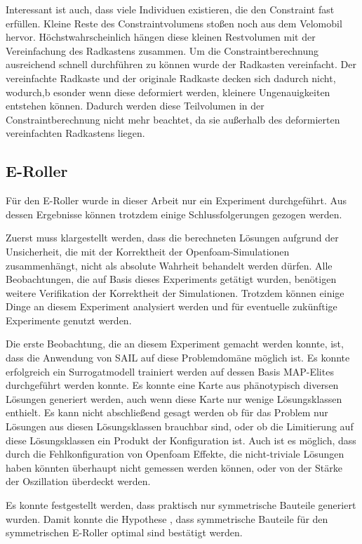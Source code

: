 Interessant ist auch, dass viele Individuen existieren, die den Constraint fast erfüllen.
Kleine Reste des Constraintvolumens stoßen noch aus dem Velomobil hervor.
Höchstwahrscheinlich hängen diese kleinen Restvolumen mit der Vereinfachung des Radkastens zusammen.
Um die Constraintberechnung ausreichend schnell durchführen zu können wurde der Radkasten vereinfacht.
Der vereinfachte Radkaste und der originale Radkaste decken sich dadurch nicht, wodurch,b esonder wenn diese deformiert werden, kleinere Ungenauigkeiten entstehen können.
Dadurch werden diese Teilvolumen in der Constraintberechnung nicht mehr beachtet, da sie außerhalb des deformierten vereinfachten Radkastens liegen.



\subsection{E-Roller}

Für den E-Roller wurde in dieser Arbeit nur ein Experiment durchgeführt.
Aus dessen Ergebnisse können trotzdem einige Schlussfolgerungen gezogen werden.

Zuerst muss klargestellt werden, dass  die berechneten Lösungen aufgrund der Unsicherheit, die mit der Korrektheit der Openfoam-Simulationen zusammenhängt, nicht als absolute Wahrheit behandelt werden dürfen.
Alle Beobachtungen, die auf Basis dieses Experiments getätigt wurden, benötigen weitere Verifikation der Korrektheit der Simulationen.
Trotzdem können einige Dinge an diesem Experiment analysiert werden und für eventuelle zukünftige Experimente genutzt werden.

Die erste Beobachtung, die an diesem Experiment gemacht werden konnte, ist, dass die Anwendung von SAIL auf diese Problemdomäne möglich ist.
Es konnte erfolgreich ein Surrogatmodell trainiert werden auf dessen Basis MAP-Elites durchgeführt werden konnte.
Es konnte eine Karte aus phänotypisch diversen Lösungen generiert werden, auch wenn diese Karte nur wenige Lösungsklassen enthielt.
Es kann nicht abschließend gesagt werden ob für das Problem nur Lösungen aus diesen Lösungsklassen brauchbar sind, oder ob die Limitierung auf diese Lösungsklassen ein Produkt der Konfiguration ist.
Auch ist es möglich, dass durch die Fehlkonfiguration von Openfoam Effekte, die nicht-triviale Lösungen haben könnten überhaupt nicht gemessen werden können, oder von der Stärke der Oszillation überdeckt werden.

Es konnte festgestellt werden, dass praktisch nur symmetrische Bauteile generiert wurden.
Damit konnte die Hypothese , dass symmetrische Bauteile für den symmetrischen E-Roller optimal sind bestätigt werden.

